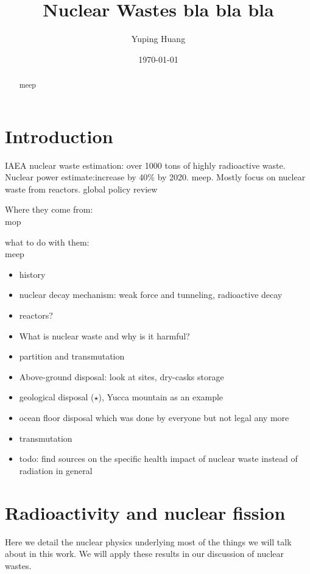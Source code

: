 \documentclass[preprint,aip,pra]{revtex4-1}
\begin{document}
\title{Nuclear Wastes bla bla bla}

\author{Yuping Huang}%

\date{\today}%
\begin{abstract}
    meep
\end{abstract}
\maketitle
\tableofcontents
\newpage

\section{Introduction}
IAEA nuclear waste estimation: over 1000 tons of highly radioactive waste.\cite{iaea08}
Nuclear power estimate:increase by 40\% by 2020. \cite{iaea12}
meep. Mostly focus on nuclear waste from reactors.
global policy review \cite{r12} 

Where they come from:\\
mop

what to do with them:\\
meep

\begin{itemize}
    \item history
    \item nuclear decay mechanism: weak force and tunneling, radioactive decay
    \item reactors?
    \item What is nuclear waste and why is it harmful?
    \item partition and transmutation
    \item Above-ground disposal: look at sites, dry-casks storage
    \item geological disposal ($\star$), Yucca mountain as an example
    \item ocean floor disposal which was done by everyone but not legal any more
    \item transmutation
    \item todo: find sources on the specific health impact of nuclear waste instead of radiation
        in general
\end{itemize}

\section{Radioactivity and nuclear fission}
    Here we detail the nuclear physics underlying most of the things we will talk about
    in this work. We will apply these results in our discussion of nuclear wastes.
\end{document}
